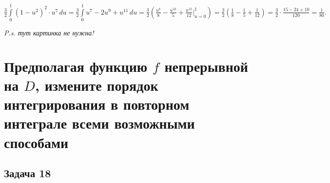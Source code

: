 \documentclass[a4paper, fleqn]{article}
\begin{document}
    $\frac{3}{2} \int\limits_{0}^{1} (1 - u^2)^2 \cdot u^7 \, du = \frac{3}{2} \int\limits_{0}^{1} u^7 - 2 u^9 + u^{11} \, du = \frac{3}{2} \left( \frac{u^8}{8} - \frac{u^{10}}{5} + \frac{u^{12}}{12} \Bigg|_{u = 0}^{1}\right) = \frac{3}{2} \left(\frac{1}{8} - \frac{1}{5} + \frac{1}{12}\right) = \frac{3}{2} \cdot \frac{15 - 24 + 10}{120} = \frac{1}{80}.$
    
    \textit{P.s. тут картинка не нужна!}
    
    
    \section*{Предполагая функцию $f$ непрерывной на $D$, измените порядок интегрирования в повторном интеграле
    всеми возможными способами}
    
    \subsection*{Задача 18}
    
    
    
    
    
\end{document}

